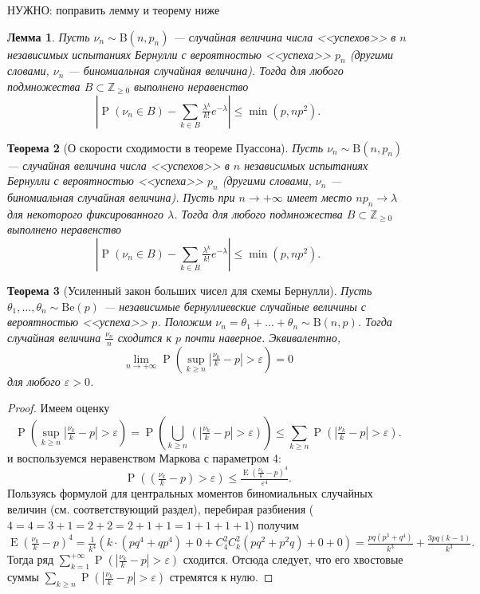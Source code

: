 \documentclass[12pt]{article}
\newtheorem{theorem}{Теорема}
\newtheorem{lemma}[theorem]{Лемма}
\numberwithin{theorem}{section}
\theoremstyle{definition}
\newcommand{\prob}{\operatorname{P}}
\newcommand{\expect}{\operatorname{E}}
\newcommand{\TODO}[1]{\textcolor{todocolor}{НУЖНО: #1}}
\begin{document}
	\TODO{поправить лемму и теорему ниже}
	
	\begin{lemma}
		Пусть $ \nu_n \sim \mathrm{B}(n, p_n) $ --- случайная величина числа <<успехов>> в $ n $ независимых испытаниях Бернулли
		с вероятностью <<успеха>> $ p_n $ (другими словами, $ \nu_n $ --- биномиальная случайная величина).
		Тогда для любого подмножества $ B \subset \mathbb{Z}_{\geqslant 0} $ выполнено неравенство
		$$ \left|\prob(\nu_n \in B) - \sum\limits_{k \in B}\tfrac{\lambda^k}{k!}e^{-\lambda}\right| \leqslant \min(p, np^2). $$
	\end{lemma}
	
	\begin{theorem}[О скорости сходимости в теореме Пуассона]
		Пусть $ \nu_n \sim \mathrm{B}(n, p_n) $ --- случайная величина числа <<успехов>> в $ n $ независимых испытаниях Бернулли
		с вероятностью <<успеха>> $ p_n $ (другими словами, $ \nu_n $ --- биномиальная случайная величина).
		Пусть при $ n \to +\infty $ имеет место $ np_n \to \lambda $ для некоторого фиксированного $ \lambda $.
		Тогда для любого подмножества $ B \subset \mathbb{Z}_{\geqslant 0} $ выполнено неравенство
		$$ \left|\prob(\nu_n \in B) - \sum\limits_{k \in B}\tfrac{\lambda^k}{k!}e^{-\lambda}\right| \leqslant \min(p, np^2). $$
	\end{theorem}
	
	\begin{theorem}[Усиленный закон больших чисел для схемы Бернулли]
		Пусть $ \theta_1, \ldots, \theta_n \sim \mathrm{Be}(p) $ --- независимые бернуллиевские случайные величины
		с вероятностью <<успеха>> $ p $. Положим $ \nu_n = \theta_1 + \ldots + \theta_n \sim \mathrm{B}(n, p) $.
		Тогда случайная величина $ \tfrac{\nu_n}{n} $ сходится к $ p $ почти наверное.
		Эквивалентно,
		$$ \lim\limits_{n \to +\infty} 
		\prob(\sup\limits_{k \geqslant n} \left|\tfrac{\nu_k}{k} - p\right| > \varepsilon) = 0 $$
		для любого $ \varepsilon > 0 $.
	\end{theorem}
	
	\begin{proof}
		Имеем оценку
		$$ \prob(\sup\limits_{k \geqslant n} \left|\tfrac{\nu_k}{k} - p\right| > \varepsilon)
		= \prob(\bigcup\limits_{k \geqslant n} (\left|\tfrac{\nu_k}{k} - p\right| > \varepsilon))
		\leqslant \sum\limits_{k \geqslant n} \prob(\left|\tfrac{\nu_k}{k} - p\right| > \varepsilon). $$
		и воспользуемся неравенством Маркова с параметром 4:
		$$ \prob(\left(\tfrac{\nu_k}{k} - p\right) > \varepsilon) \leqslant 
		\tfrac{\expect\left(\tfrac{\nu_k}{k} - p\right)^4}{\varepsilon^4}. $$
		Пользуясь формулой для центральных моментов биномиальных случайных величин (см. соответствующий раздел),
		перебирая разбиения ($ 4 = 4 = 3 + 1 = 2 + 2 = 2 + 1 + 1 = 1 + 1 + 1 + 1 $) получим
		$$ \expect\left(\tfrac{\nu_k}{k} - p\right)^4
		= \tfrac{1}{k^4}(k\cdot(pq^4 + qp^4) + 0 + C_{4}^{2}C_k^2(pq^2 + p^2q) + 0 + 0)
		= \tfrac{pq(p^3 + q^4)}{k^3} + \tfrac{3pq(k - 1)}{k^3}. $$
		Тогда ряд $ \sum\limits_{k = 1}^{+\infty} \prob(\left|\tfrac{\nu_k}{k} - p\right| > \varepsilon) $
		сходится. Отсюда следует, что его хвостовые суммы
		$ \sum\limits_{k \geqslant n} \prob(\left|\tfrac{\nu_k}{k} - p\right| > \varepsilon) $
		стремятся к нулю.
	\end{proof}
	
\end{document}
